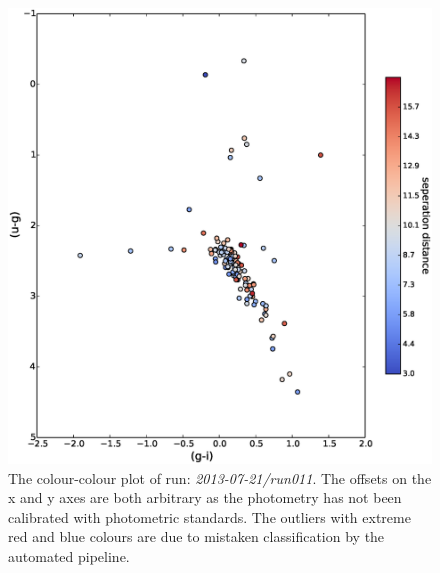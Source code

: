 \begin{figure}
\centering
\includegraphics[width=120mm]{images/2013-07-21-run011-2colour.eps}
\caption{The colour-colour plot of run: \emph{2013-07-21/run011}. The offsets on the x and y axes are both arbitrary as the photometry has not been calibrated with photometric standards. The outliers with extreme red and blue colours are due to mistaken classification by the automated pipeline. }
\label{fig:run011-2colour}
\end{figure}

